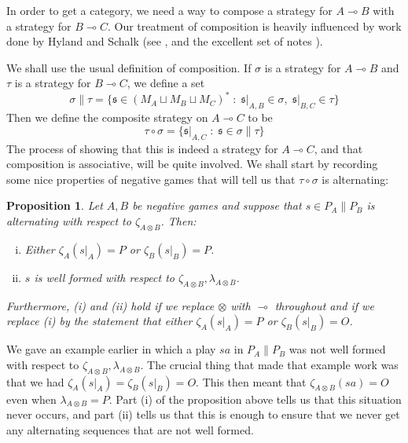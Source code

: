 \documentclass[11pt]{article} %
\theoremstyle{plain} %
\newtheorem{proposition}[theorem]{Proposition}
\theoremstyle{definition} %
\theoremstyle{note}
\theoremstyle{exercisestyle}
\newcommand{\tensor}{\otimes}
\renewcommand{\implies}{\multimap}
\newcommand{\comp}[2]{#1 \circ #2}
\newcommand{\cprd}{\sqcup}
\newcommand{\suchthat}{\;\colon\;}
\newcommand{\s}{\mathfrak s}
\begin{document}
In order to get a category, we need a way to compose a strategy for $A\implies B$ with a strategy for $B\implies C$.  Our treatment of composition is heavily influenced by work done by Hyland and Schalk (see \cite{hyland1997games}, \cite{hylandschalkgames} and the excellent set of notes \cite{Schalk2001GsNotes}).  

We shall use the usual definition of composition.  If $\sigma$ is a strategy for $A\implies B$ and $\tau$ is a strategy for $B\implies C$, we define a set
\[
  \sigma\|\tau = \{\s\in (M_A \cprd M_B \cprd M_C)^*\suchthat \s\vert_{A,B}\in\sigma,\;\s\vert_{B,C}\in\tau\}
  \]
Then we define the composite strategy on $A\implies C$ to be
\[
  \comp\tau\sigma = \{\s\vert_{A,C}\suchthat\s\in\sigma\|\tau\}
  \]
The process of showing that this is indeed a strategy for $A\implies C$, and that composition is associative, will be quite involved.  We shall start by recording some nice properties of negative games that will tell us that $\comp\tau\sigma$ is alternating:

\begin{proposition}
  Let $A,B$ be negative games and suppose that $s\in P_A\|P_B$ is alternating with respect to $\zeta_{A\tensor B}$.  Then:
  \begin{enumerate}[i)]
    \item Either $\zeta_{A}(s\vert_A)=P$ or $\zeta_{B}(s\vert_B)=P$.  
    \item $s$ is well formed with respect to $\zeta_{A\tensor B},\lambda_{A\tensor B}$.  
  \end{enumerate}
  Furthermore, (i) and (ii) hold if we replace $\tensor$ with $\implies$ throughout and if we replace (i) by the statement that either $\zeta_A(s\vert_A)=P$ or $\zeta_B(s\vert_B)=O$.
  \label{nice-negative-games}
\end{proposition}

We gave an example earlier in which a play $sa$ in $P_A\|P_B$ was not well formed with respect to $\zeta_{A\tensor B},\lambda_{A\tensor B}$.  The crucial thing that made that example work was that we had $\zeta_A(s\vert_A)=\zeta_B(s\vert_B)=O$.  This then meant that $\zeta_{A\tensor B}(sa)=O$ even when $\lambda_{A\tensor B}=P$.  Part (i) of the proposition above tells us that this situation never occurs, and part (ii) tells us that this is enough to ensure that we never get any alternating sequences that are not well formed.
\end{document}
